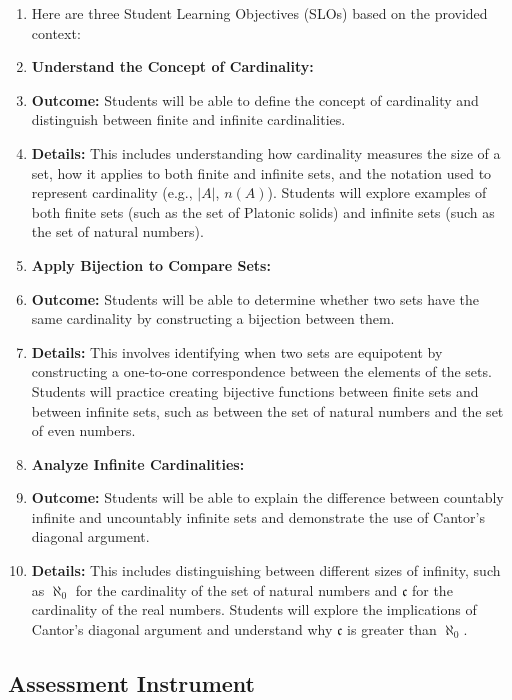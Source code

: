 \begin{enumerate}
    \item Here are three Student Learning Objectives (SLOs) based on the provided context:
    \item \textbf{Understand the Concept of Cardinality:}
    \item \textbf{Outcome:} Students will be able to define the concept of cardinality and distinguish between finite and infinite cardinalities.
    \item \textbf{Details:} This includes understanding how cardinality measures the size of a set, how it applies to both finite and infinite sets, and the notation used to represent cardinality (e.g., $|A|$, $n(A)$). Students will explore examples of both finite sets (such as the set of Platonic solids) and infinite sets (such as the set of natural numbers).
    \item \textbf{Apply Bijection to Compare Sets:}
    \item \textbf{Outcome:} Students will be able to determine whether two sets have the same cardinality by constructing a bijection between them.
    \item \textbf{Details:} This involves identifying when two sets are equipotent by constructing a one-to-one correspondence between the elements of the sets. Students will practice creating bijective functions between finite sets and between infinite sets, such as between the set of natural numbers and the set of even numbers.
    \item \textbf{Analyze Infinite Cardinalities:}
    \item \textbf{Outcome:} Students will be able to explain the difference between countably infinite and uncountably infinite sets and demonstrate the use of Cantor's diagonal argument.
    \item \textbf{Details:} This includes distinguishing between different sizes of infinity, such as $\aleph _0$ for the cardinality of the set of natural numbers and $\mathfrak{c}$ for the cardinality of the real numbers. Students will explore the implications of Cantor's diagonal argument and understand why $\mathfrak{c}$ is greater than $\aleph _0$.
\end{enumerate}


\subsection{Assessment Instrument}
\label{ssec:asse-3669}


